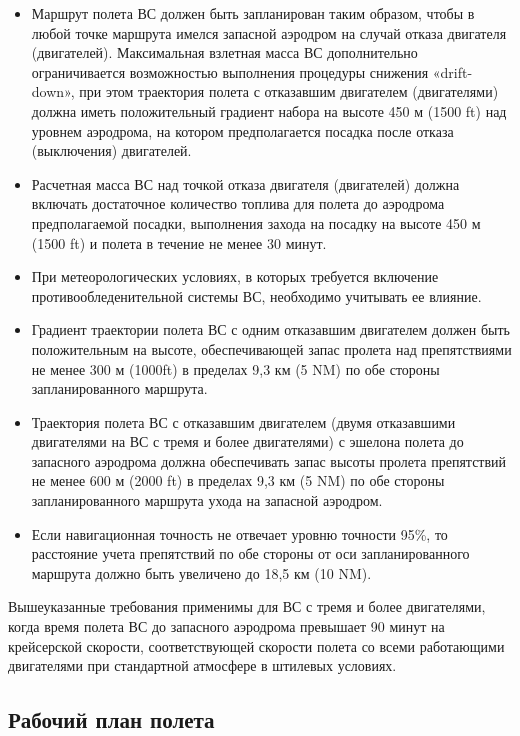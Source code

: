 \begin{itemize}
    \item Маршрут полета ВС должен быть запланирован таким образом, чтобы в любой точке маршрута имелся запасной аэродром на случай отказа двигателя (двигателей). Максимальная взлетная масса ВС дополнительно ограничивается возможностью выполнения процедуры снижения «drift-down», при этом траектория полета с отказавшим двигателем (двигателями) должна иметь положительный градиент набора на высоте 450 м (1500 ft) над уровнем аэродрома, на котором предполагается посадка после отказа (выключения) двигателей.
    \item Расчетная масса ВС над точкой отказа двигателя (двигателей) должна включать достаточное количество топлива для полета до аэродрома предполагаемой посадки, выполнения захода на посадку на высоте 450 м (1500 ft) и полета в течение не менее 30 минут.
    \item При метеорологических условиях, в которых требуется включение противообледенительной системы ВС, необходимо учитывать ее влияние.
    \item Градиент траектории полета ВС с одним отказавшим двигателем должен быть положительным на высоте, обеспечивающей запас пролета над препятствиями не менее 300 м (1000ft) в пределах 9,3 км (5 NM) по обе стороны запланированного маршрута.
    \item Траектория полета ВС с отказавшим двигателем (двумя отказавшими двигателями на ВС с тремя и более двигателями) с эшелона полета до запасного аэродрома должна обеспечивать запас высоты пролета препятствий не менее 600 м (2000 ft) в пределах 9,3 км (5 NM) по обе стороны запланированного маршрута ухода на запасной аэродром.
    \item Если навигационная точность не отвечает уровню точности 95\%, то расстояние учета препятствий по обе стороны от оси запланированного маршрута должно быть увеличено до 18,5 км (10 NM).
\end{itemize}

Вышеуказанные требования применимы для ВС с тремя и более двигателями, когда время полета ВС до запасного аэродрома превышает 90 минут на крейсерской скорости, соответствующей скорости полета со всеми работающими двигателями при стандартной атмосфере в штилевых условиях.

\subsection{Рабочий план полета}

